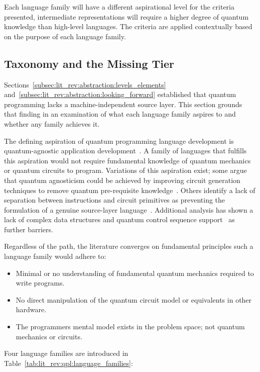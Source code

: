 Each language family will have a different aspirational level for the criteria presented, intermediate representations will require a higher degree of quantum knowledge than high-level languages.
The criteria are applied contextually based on the purpose of each language family.

\subsection{Taxonomy and the Missing Tier}\label{subsec:lit_rev:qpl:taxonomy}
Sections~\ref{subsec:lit_rev:abstraction:levels_elements} and~\ref{subsec:lit_rev:abstraction:looking_forward} established that quantum programming lacks a machine-independent source layer.
This section grounds that finding in an examination of what each language family aspires to and whether any family achieves it.

The defining aspiration of quantum programming language development is quantum-agnostic application development~\cite{nunez_corrales2025betterabstractmachines}.
A family of languages that fulfills this aspiration would not require fundamental knowledge of quantum mechanics or quantum circuits to program.
Variations of this aspiration exist; some argue that quantum agnosticism could be achieved by improving circuit generation techniques to remove quantum pre-requisite knowledge~\cite{cobb2022higherlevelabstractions}.
Others identify a lack of separation between instructions and circuit primitives as preventing the formulation of a genuine source-layer language~\cite{nunez_corrales2025betterabstractmachines}.
Additional analysis has shown a lack of complex data structures and quantum control sequence support~\cite{Gay2006QPLSurvey} as further barriers.

Regardless of the path, the literature converges on fundamental principles such a language family would adhere to:
\begin{itemize}
    \item Minimal or no understanding of fundamental quantum mechanics required to write programs.
    \item No direct manipulation of the quantum circuit model or equivalents in other hardware.
    \item The programmers mental model exists in the problem space; not quantum mechanics or circuits.
\end{itemize}

Four language families are introduced in Table~\ref{tab:lit_rev:qpl:language_families}:


